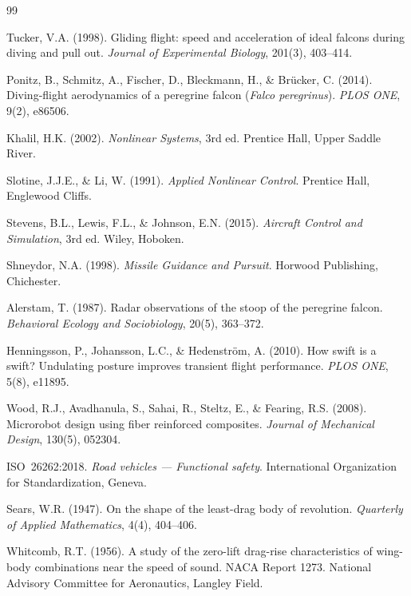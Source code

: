 ﻿\documentclass[12pt,a4paper]{article}
\theoremstyle{remark}
\begin{document}
	\begin{thebibliography}{99}
		
		Tucker, V.A. (1998). Gliding flight: speed and acceleration of ideal falcons during diving and pull out. \textit{Journal of Experimental Biology}, 201(3), 403--414.
		
		Ponitz, B., Schmitz, A., Fischer, D., Bleckmann, H., \& Brücker, C. (2014). Diving-flight aerodynamics of a peregrine falcon (\textit{Falco peregrinus}). \textit{PLOS ONE}, 9(2), e86506.
		
		Khalil, H.K. (2002). \textit{Nonlinear Systems}, 3rd ed. Prentice Hall, Upper Saddle River.
		
		Slotine, J.J.E., \& Li, W. (1991). \textit{Applied Nonlinear Control}. Prentice Hall, Englewood Cliffs.
		
		Stevens, B.L., Lewis, F.L., \& Johnson, E.N. (2015). \textit{Aircraft Control and Simulation}, 3rd ed. Wiley, Hoboken.
		
		Shneydor, N.A. (1998). \textit{Missile Guidance and Pursuit}. Horwood Publishing, Chichester.
		
		Alerstam, T. (1987). Radar observations of the stoop of the peregrine falcon. \textit{Behavioral Ecology and Sociobiology}, 20(5), 363--372.
		
		Henningsson, P., Johansson, L.C., \& Hedenström, A. (2010). How swift is a swift? Undulating posture improves transient flight performance. \textit{PLOS ONE}, 5(8), e11895.
		
		Wood, R.J., Avadhanula, S., Sahai, R., Steltz, E., \& Fearing, R.S. (2008). Microrobot design using fiber reinforced composites. \textit{Journal of Mechanical Design}, 130(5), 052304.
		
		ISO~26262:2018. \textit{Road vehicles --- Functional safety}. International Organization for Standardization, Geneva.


		Sears, W.R. (1947). On the shape of the least-drag body of revolution. \textit{Quarterly of Applied Mathematics}, 4(4), 404--406.

		Whitcomb, R.T. (1956). A study of the zero-lift drag-rise characteristics of wing-body combinations near the speed of sound. NACA Report 1273. National Advisory Committee for Aeronautics, Langley Field.


\end{thebibliography}
\end{document}
